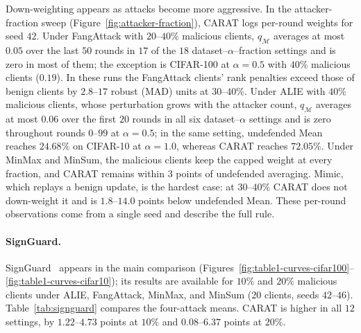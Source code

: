 Down-weighting appears as attacks become more aggressive. In the attacker-fraction sweep (Figure~\ref{fig:attacker-fraction}), CARAT logs per-round weights for seed $42$. Under FangAttack with $20$--$40\%$ malicious clients, $q_{\mathcal{M}}$ averages at most $0.05$ over the last $50$ rounds in $17$ of the $18$ dataset--$\alpha$--fraction settings and is zero in most of them; the exception is CIFAR-100 at $\alpha=0.5$ with $40\%$ malicious clients ($0.19$). In these runs the FangAttack clients' rank penalties exceed those of benign clients by $2.8$--$17$ robust (MAD) units at $30$--$40\%$. Under ALIE with $40\%$ malicious clients, whose perturbation grows with the attacker count, $q_{\mathcal{M}}$ averages at most $0.06$ over the first $20$ rounds in all six dataset--$\alpha$ settings and is zero throughout rounds $0$--$99$ at $\alpha=0.5$; in the same setting, undefended Mean reaches $24.68\%$ on CIFAR-10 at $\alpha=1.0$, whereas CARAT reaches $72.05\%$. Under MinMax and MinSum, the malicious clients keep the capped weight at every fraction, and CARAT remains within $3$ points of undefended averaging. Mimic, which replays a benign update, is the hardest case: at $30$--$40\%$ CARAT does not down-weight it and is $1.8$--$14.0$ points below undefended Mean. These per-round observations come from a single seed and describe the full rule.

\paragraph{SignGuard.}
SignGuard~\citep{xu2022signguard} appears in the main comparison (Figures~\ref{fig:table1-curves-cifar100}--\ref{fig:table1-curves-cifar10}); its results are available for $10\%$ and $20\%$ malicious clients under ALIE, FangAttack, MinMax, and MinSum ($20$ clients, seeds $42$--$46$). Table~\ref{tab:signguard} compares the four-attack means. CARAT is higher in all $12$ settings, by $1.22$--$4.73$ points at $10\%$ and $0.08$--$6.37$ points at $20\%$.

